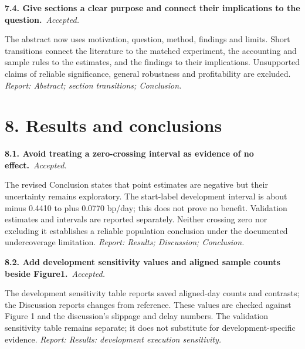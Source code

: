 \documentclass[11pt,a4paper]{article}
\newcommand{\Needspace}[1]{\par\begingroup\ifdim\dimexpr\pagegoal-\pagetotal\relax<#1\relax\newpage\fi\endgroup}
\newcommand{\reply}[3]{\par\addvspace{5pt}\noindent\textbf{#1. #2}\ \textit{#3.}\par\nobreak}
\begin{document}
\par\noindent\begin{minipage}{\linewidth}\justifying
\reply{7.4}{Give sections a clear purpose and connect their implications to the question.}{Accepted}
The abstract now uses motivation, question, method, findings and limits. Short transitions connect the literature to the matched experiment, the accounting and sample rules to the estimates, and the findings to their implications. Unsupported claims of reliable significance, general robustness and profitability are excluded.
{\small\textit{Report: Abstract; section transitions; Conclusion.}}
\end{minipage}\par\addvspace{5pt}

\Needspace{10\baselineskip}
\section*{8. Results and conclusions}
\par\noindent\begin{minipage}{\linewidth}\justifying
\reply{8.1}{Avoid treating a zero-crossing interval as evidence of no effect.}{Accepted}
The revised Conclusion states that point estimates are negative but their uncertainty remains exploratory. The start-label development interval is about minus 0.4410 to plus 0.0770 bp/day; this does not prove no benefit. Validation estimates and intervals are reported separately. Neither crossing zero nor excluding it establishes a reliable population conclusion under the documented undercoverage limitation.
{\small\textit{Report: Results; Discussion; Conclusion.}}
\end{minipage}\par\addvspace{5pt}

\par\noindent\begin{minipage}{\linewidth}\justifying
\reply{8.2}{Add development sensitivity values and aligned sample counts beside Figure1.}{Accepted}
The development sensitivity table reports saved aligned-day counts and contrasts; the Discussion reports changes from reference. These values are checked against Figure 1 and the discussion's slippage and delay numbers. The validation sensitivity table remains separate; it does not substitute for development-specific evidence.
{\small\textit{Report: Results: development execution sensitivity.}}
\end{minipage}\par\addvspace{5pt}
\end{document}

